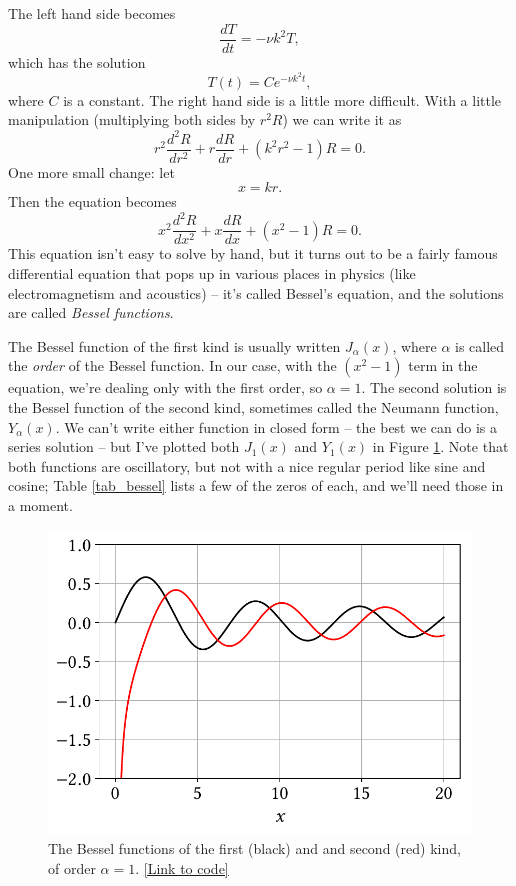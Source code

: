 The left hand side becomes
\[
 \frac{dT}{dt} = -\nu k^2 T,
\]
which has the solution
\begin{equation}
T(t) = C e^{-\nu k^2 t},
\end{equation}
where $C$ is a constant.  The right hand side is a little more difficult.  With a little manipulation (multiplying both sides by $r^2 R$) we can write it as
\[
r^2 \frac{d^2R}{dr^2} + r\frac{dR}{dr} + \left( k^2 r^2 - 1 \right) R = 0.
\]
One more small change:  let 
\[
x = k r.
\]
Then the equation becomes
\begin{equation}
\label{eq_bessel}
x^2 \frac{d^2R}{dx^2} + x\frac{dR}{dx} + \left(  x^2 - 1 \right) R = 0.
\end{equation}
This equation isn't easy to solve by hand, but it turns out to be a fairly famous differential equation that pops up in various places in physics (like electromagnetism and acoustics) -- it's called Bessel's equation, and the solutions are called \emph{Bessel functions}.

The Bessel function of the first kind is usually written $J_\alpha(x)$, where $\alpha$ is called the \emph{order} of the Bessel function.  In our case, with the $(x^2 - 1)$ term in the equation, we're dealing only with the first order, so $\alpha = 1$.  The second solution is the Bessel function of the second kind, sometimes called the Neumann function, $Y_\alpha(x)$.  We can't write either function in closed form -- the best we can do is a series solution -- but I've plotted both $J_1(x)$ and $Y_1(x)$  in Figure \ref{fig_bessel}.  Note that both functions are oscillatory, but not with a nice regular period like sine and cosine; Table \ref{tab_bessel} lists a few of the zeros of each, and we'll need those in a moment.

\begin{figure}
\centering
\includegraphics[width=0.7\linewidth]{Figures/Chapter2/fig_bessel}
\caption{The Bessel functions of the first (black) and and second (red) kind, of order $\alpha = 1$. \href{https://nbviewer.jupyter.org/github/josephmacmillan/IntroFluidDynamics/blob/master/Jupyter/2-ViscousFluids.ipynb\#Figure-2.10:-Bessel-functions}{[Link to code]}}
\label{fig_bessel}
\end{figure}

